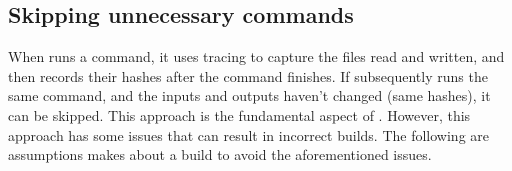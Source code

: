 \subsection{Skipping unnecessary commands}
\label{sec:skipping_unnecessary}

When \Rattle runs a command, it uses tracing to capture the files read and written, and then records their hashes after the command finishes. If \Rattle subsequently runs the same command, and the inputs and outputs haven't changed (same hashes), it can be skipped. This approach is the fundamental aspect of \Fabricate\citep{fabricate}. However, this approach has some issues that can result in incorrect builds.  The following are assumptions \Rattle makes about a build to avoid the aforementioned issues.


